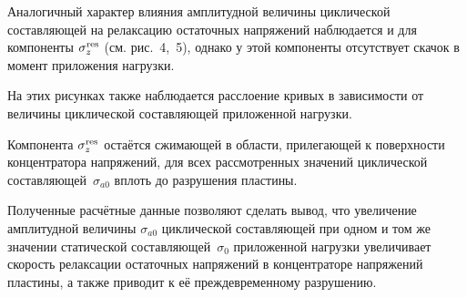 Аналогичный характер влияния амплитудной величины циклической составляющей на релаксацию остаточных напряжений наблюдается и для компоненты $\sigma_{z}^{\rm res}$ (см. рис.~4,~5), однако у этой компоненты отсутствует скачок в момент приложения нагрузки. 

На этих рисунках также наблюдается расслоение кривых в зависимости от величины циклической составляющей приложенной нагрузки.

Компонента $\sigma_{z}^{\rm res}$ остаётся сжимающей в области, прилегающей к поверхности концентратора напряжений, для всех рассмотренных значений циклической составляющей~$\sigma_{a0}$ вплоть до разрушения пластины.



Полученные расчётные данные позволяют сделать вывод, что увеличение амплитудной величины $\sigma_{a0}$ циклической составляющей   при одном и том же значении статической составляющей~$\sigma_{0}$ приложенной нагрузки  увеличивает скорость релаксации остаточных напряжений в концентраторе напряжений пластины, а также приводит к её преждевременному разрушению.






%

%

%

%

%


%

%

%

%

%











